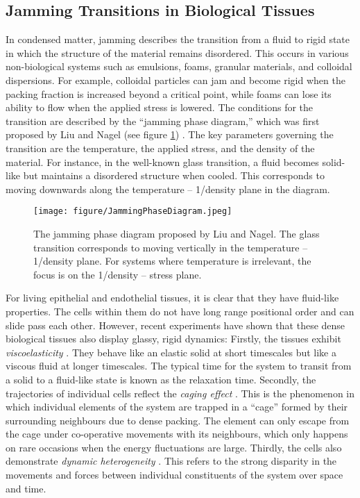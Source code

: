 \documentclass[a4paper,12pt]{article}
\begin{document}
\subsection{Jamming Transitions in Biological Tissues}
In condensed matter, jamming describes the transition from a fluid to rigid state in which the structure of the material remains disordered. This occurs in various non-biological systems such as emulsions, foams, granular materials, and colloidal dispersions\cite{hecke2010}. For example, colloidal particles can jam and become rigid when the packing fraction is increased beyond a critical point, while foams can lose its ability to flow when the applied stress is lowered. The conditions for the transition are described by the ``jamming phase diagram,'' which was first proposed by Liu and Nagel (see figure \ref{fig:JammingPhaseDiagram}) \cite{liu1998}. The key parameters governing the transition are the temperature, the applied stress, and the density of the material. For instance, in the well-known glass transition, a fluid becomes solid-like but maintains a disordered structure when cooled. This corresponds to moving downwards along the temperature -- 1/density plane in the diagram. 

\begin{figure}[h]
\centering
\texttt{[image: figure/JammingPhaseDiagram.jpeg]}
\caption{The jamming phase diagram proposed by Liu and Nagel. The glass transition corresponds to moving vertically in the temperature -- 1/density plane. For systems where temperature is irrelevant, the focus is on the 1/density -- stress plane. }
\label{fig:JammingPhaseDiagram}
\end{figure}

For living epithelial and endothelial tissues, it is clear that they have fluid-like properties. The cells within them do not have long range positional order and can slide pass each other. However, recent experiments have shown that these dense biological tissues also display glassy, rigid dynamics: Firstly, the tissues exhibit \emph{viscoelasticity} \cite{schoetz2013}. They behave like an elastic solid at short timescales but like a viscous fluid at longer timescales. The typical time for the system to transit from a solid to a fluid-like state is known as the relaxation time. Secondly, the trajectories of individual cells reflect the \emph{caging effect} \cite{schoetz2013}. This is the phenomenon in which individual elements of the system are trapped in a ``cage'' formed by their surrounding neighbours due to dense packing. The element can only escape from the cage under co-operative movements with its neighbours, which only happens on rare occasions when the energy fluctuations are large. Thirdly, the cells also demonstrate \emph{dynamic heterogeneity} \cite{angelini2010}. This refers to the strong disparity in the movements and forces between individual constituents of the system over space and time.  
\end{document}

